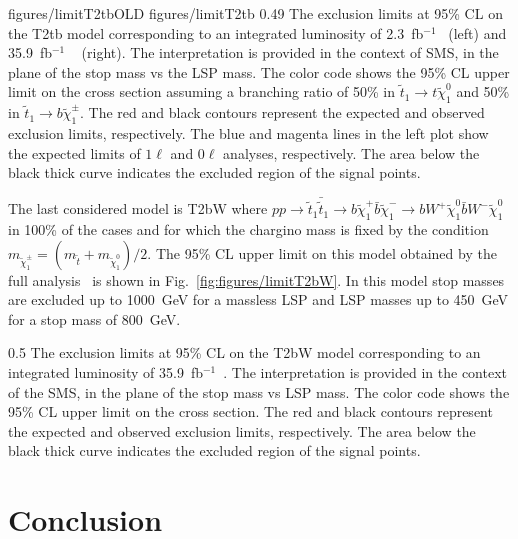                  {figures/limitT2tbOLD} %
                 {figures/limitT2tb} %
                 {0.49}       %
                 { The exclusion limits at 95\% CL on the T2tb model corresponding to an integrated luminosity of 2.3~fb$^{-1}$~\cite{Sirunyan:2016jpr} (left) and   35.9~fb$^{-1}$ ~\cite{Sirunyan:2017xse} (right). The interpretation is provided in the context of SMS, in the plane of the stop mass vs the LSP mass. The color code shows the 95\% CL upper limit on the cross section assuming a branching ratio of 50\% in $ \tilde{t}_{1} \to t  \tilde{\chi}^{0}_{1} $ and 50\% in $ \tilde{t}_{1} \to b  \tilde{\chi}^{\pm}_{1} $. The red and black contours represent the expected and observed exclusion limits, respectively. The blue and magenta lines in the left plot show the expected limits of $1 \ell$ and $0 \ell$ analyses, respectively.  The area below the black thick curve indicates the excluded region of the signal points.  }

The last considered model is T2bW where $ pp \to \tilde{t}_{1} \bar{\tilde{t}}_{1} \to b \tilde{\chi}^{+}_{1} \bar{b} \tilde{\chi}^{-}_{1} \to b W^{+} \tilde{\chi}^{0}_{1} \bar{b} W^{-} \tilde{\chi}^{0}_{1}$ in 100\% of the cases and  for which the chargino mass is fixed by the condition $m_{\tilde{\chi}_{1}^{\pm}} = ( m_{\tilde{t}} +  m_{\tilde{\chi}_{1}^{0}} )/2$. The 95\% CL upper limit on this model obtained by the full analysis~\cite{Sirunyan:2017xse} is shown in Fig.~\ref{fig:figures/limitT2bW}. In this model stop masses are excluded up to 1000~GeV for a massless LSP and LSP masses up to 450~GeV for a stop mass of 800~GeV.

                 {0.5}       %
                 { The exclusion limits at 95\% CL on the T2bW model corresponding to an integrated luminosity of 35.9~fb$^{-1}$~\cite{Sirunyan:2017xse}. The interpretation is provided in the context of the SMS, in the plane of the stop mass vs LSP mass. The color code shows the 95\% CL upper limit on the cross section. The red and black contours represent the expected and observed exclusion limits, respectively. The area below the black thick curve indicates the excluded region of the signal points.  }


\section{Conclusion}

